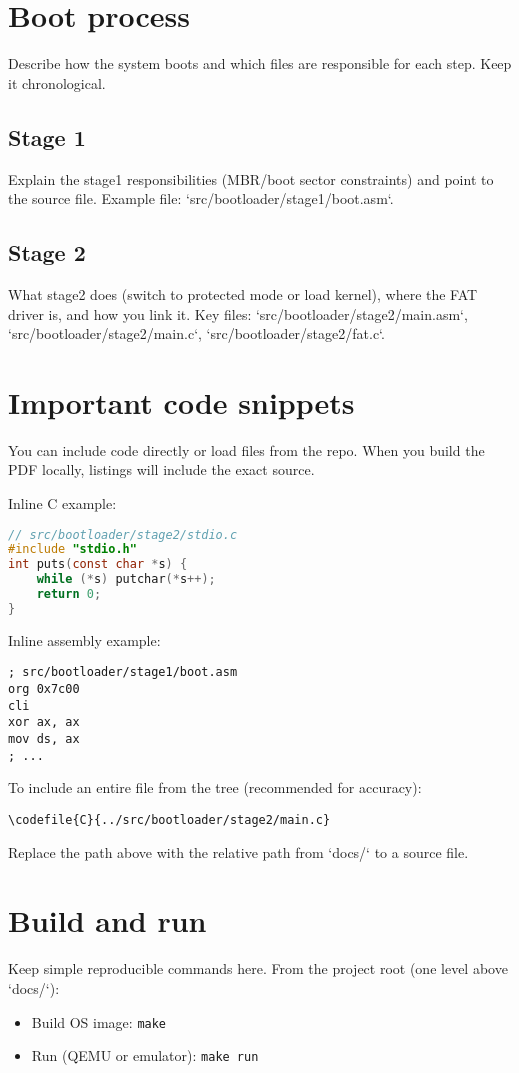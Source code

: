 \documentclass[11pt,a4paper]{article}
\newcommand{\codefile}[2]{}
\begin{document}
\section{Boot process}
Describe how the system boots and which files are responsible for each step. Keep it chronological.

\subsection{Stage 1}
Explain the stage1 responsibilities (MBR/boot sector constraints) and point to the source file.
Example file: `src/bootloader/stage1/boot.asm`.

\subsection{Stage 2}
What stage2 does (switch to protected mode or load kernel), where the FAT driver is, and how you link it.
Key files: `src/bootloader/stage2/main.asm`, `src/bootloader/stage2/main.c`, `src/bootloader/stage2/fat.c`.

\section{Important code snippets}
You can include code directly or load files from the repo. When you build the PDF locally, listings will include the exact source.

Inline C example:
\begin{lstlisting}[language=C,caption={Minimal example from stdio.c}]
// src/bootloader/stage2/stdio.c
#include "stdio.h"
int puts(const char *s) {
	while (*s) putchar(*s++);
	return 0;
}
\end{lstlisting}

Inline assembly example:
\begin{lstlisting}[language=asm86,caption={Boot sector entry (example)}]
; src/bootloader/stage1/boot.asm
org 0x7c00
cli
xor ax, ax
mov ds, ax
; ...
\end{lstlisting}

To include an entire file from the tree (recommended for accuracy):
\begin{verbatim}
\codefile{C}{../src/bootloader/stage2/main.c}
\end{verbatim}

Replace the path above with the relative path from `docs/` to a source file.

\section{Build and run}
Keep simple reproducible commands here. From the project root (one level above `docs/`):
\begin{itemize}
	\item Build OS image: \texttt{make}
	\item Run (QEMU or emulator): \texttt{make run}
\end{itemize}
\end{document}
